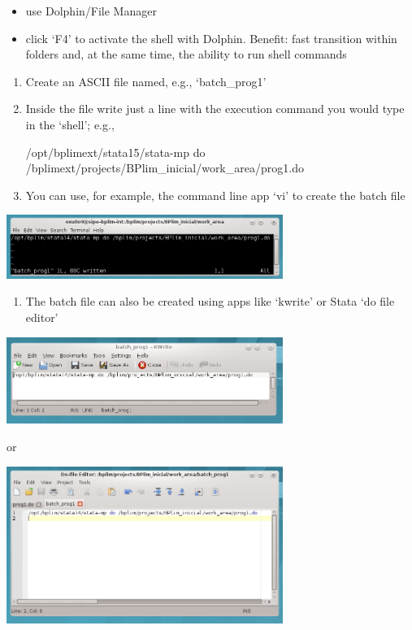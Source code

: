 \documentclass[]{book}
\providecommand{\tightlist}{%
  \setlength{\itemsep}{0pt}\setlength{\parskip}{0pt}}
\begin{document}
\begin{itemize}
\item
  use Dolphin/File Manager
\item
  click `F4' to activate the shell with Dolphin. Benefit: fast
  transition within folders and, at the same time, the ability
  to run shell commands
\end{itemize}

\begin{enumerate}
\def\labelenumi{\arabic{enumi}.}
\setcounter{enumi}{2}
\item
  Create an ASCII file named, e.g., `batch\_prog1'
\item
  Inside the file write just a line with the execution command you
  would type in the `shell'; e.g.,

  /opt/bplimext/stata15/stata-mp do
  /bplimext/projects/BPlim\_inicial/work\_area/prog1.do
\item
  You can use, for example, the command line app `vi' to create the batch file
\end{enumerate}

\includegraphics[width=3.54331in,height=0.81802in]{./media/image14.png}

\begin{enumerate}
\def\labelenumi{\arabic{enumi}.}
\setcounter{enumi}{5}
\tightlist
\item
  The batch file can also be created using apps like `kwrite' or Stata
  `do file editor'
\end{enumerate}

\includegraphics[width=3.54331in,height=1.11324in]{./media/image15.png}

or

\includegraphics[width=3.54331in,height=2.01342in]{./media/image16.png}
\end{document}
